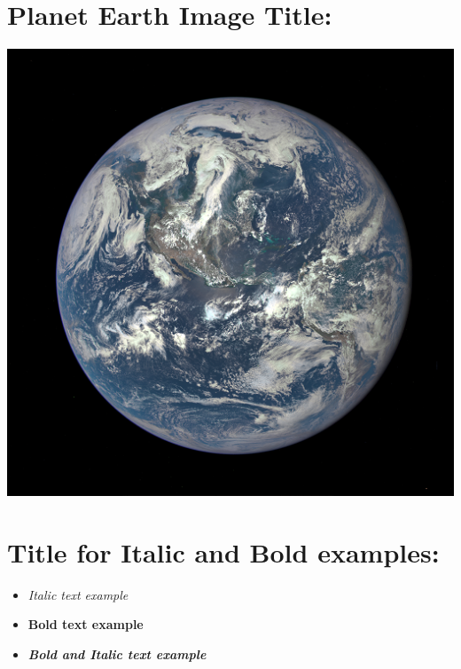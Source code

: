 \documentclass[12pt]{article} %
\begin{document}
\section*{Planet Earth Image Title:}
\begin{flushleft}
\includegraphics{earth.png} %
\end{flushleft}


\newpage


\section*{Title for Italic and Bold examples:}
\begin{flushleft}
\begin{itemize}
\item\textit{Italic text example}
\item\textbf{Bold text example}
\item\textit{\textbf{Bold and Italic text example}}
\end{itemize}
\end{flushleft}


\end{document}
